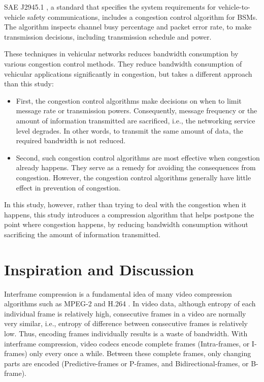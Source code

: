 \documentclass[12pt]{report}
\begin{document}
SAE J2945.1 \cite{sae2016j29451}, a standard that specifies the system requirements for vehicle-to-vehicle safety communications, includes a congestion control algorithm for BSMs. The algorithm inspects channel busy percentage and packet error rate, to make transmission decisions, including transmission schedule and power.

These techniques in vehicular networks reduces bandwidth consumption by various congestion control methods. They reduce bandwidth consumption of vehicular applications significantly in congestion, but takes a different approach than this study:

\begin{itemize}
  \item First, the congestion control algorithms make decisions on when to limit message rate or transmission powers. Consequently, message frequency or the amount of information transmitted are sacrificed, i.e., the networking service level degrades. In other words, to transmit the same amount of data, the required bandwidth is not reduced.
  \item Second, such congestion control algorithms are most effective when congestion already happens. They serve as a remedy for avoiding the consequences from congestion. However, the congestion control algorithms generally have little effect in prevention of congestion.
\end{itemize}

In this study, however, rather than trying to deal with the congestion when it happens, this study introduces a compression algorithm that helps postpone the point where congestion happens, by reducing bandwidth consumption without sacrificing the amount of information transmitted.

\section{Inspiration and Discussion}

Interframe compression is a fundamental idea of many video compression algorithms such as MPEG-2 \cite{le1991mpeg} and H.264 \cite{wiegand2003h264}. In video data, although entropy of each individual frame is relatively high, consecutive frames in a video are normally very similar, i.e., entropy of difference between consecutive frames is relatively low. Thus, encoding frames individually results is a waste of bandwidth. With interframe compression, video codecs encode complete frames (Intra-frames, or I-frames) only every once a while. Between these complete frames, only changing parts are encoded (Predictive-frames or P-frames, and Bidirectional-frames, or B-frame).
\end{document}
